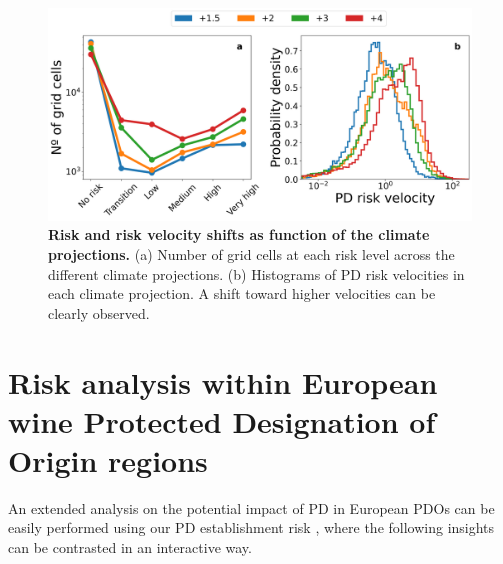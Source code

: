 \begin{figure}[H]
    \centering

    \includegraphics[width=\textwidth]{Figures/Future_risk_velocity_vector_histogram.png}
    \caption{\textbf{Risk and risk velocity shifts as function of the
            climate projections.} (a) Number of grid cells at each risk level
        across the
        different climate projections. (b) Histograms of PD risk velocities in
        each
        climate projection. A shift toward higher velocities can be clearly
        observed.}
    \label{fig:PD_future_risk_velocity}
\end{figure}

\section{Risk analysis within European wine Protected Designation of Origin
  regions}

An extended analysis on the potential impact of PD in European PDOs can be
easily performed using our PD establishment risk \webpage, where the following
insights can be contrasted in an interactive way.

